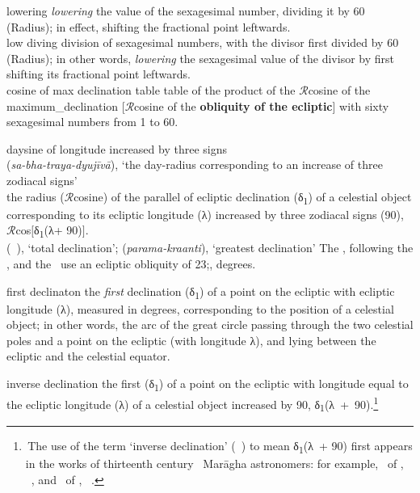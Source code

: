 lowering
\textit{lowering} the value of the sexagesimal number, \ie dividing it by 60 (Radius); in effect, shifting the fractional point leftwards.\\[5pt]

low diving
division of sexagesimal numbers, with the divisor first divided by 60 (Radius); in other words, \textit{lowering} the sexagesimal value of the divisor by first shifting its fractional point leftwards.\\[5pt]


cosine of max declination table
 table of the product of the $\mathcal{R}$\thinspace cosine of the \protect\gls{maximum_declination} [\ie $\mathcal{R}$\thinspace cosine of the \textbf{obliquity of the ecliptic}] with sixty sexagesimal numbers from 1 to 60.

daysine of longitude increased by three signs \\
 (\textit{sa-bha-traya-dyujīvā}), \lit `the day-radius corresponding to an increase of three zodiacal signs'\\
the radius ($\mathcal{R}$\thinspace cosine) of the parallel of ecliptic declination (δ\textsubscript{1}) of a celestial object corresponding to its ecliptic longitude (λ\degree) increased by three zodiacal signs (90\degree), \ie $\mathcal{R}$\thinspace cos$\Big[$δ\textsubscript{1}(λ\degree + 90\degree)$\Big]$.\\[5pt]
        
 (\mayl\idafaconsonant\ \kulli), \lit `total declination';  (\textit{parama-kraanti}), \lit `greatest declination'        
The \ZijiShahJahani, following the \ZijUlughBeg, and the \Siddhantasindhu\ use an ecliptic obliquity of 23;, degrees.

first declinaton
the \textit{first} declination (δ\textsubscript{1}) of a point on the ecliptic with ecliptic longitude (λ\degree), measured in degrees, corresponding to the position of a celestial object; in other words, the arc of the great circle passing through the two celestial poles and a point on the ecliptic (with longitude λ\degree), and lying between the ecliptic and the celestial equator.
        
inverse declination\label{inverse_declination_discussion}
the first \protect{} (δ\textsubscript{1}) of a point on the ecliptic with longitude equal to the ecliptic longitude (λ\degree) of a celestial object increased by 90\degree, \ie δ\textsubscript{1}(λ\degree~+~90\degree).\footnote{\,The use of the term `inverse declination' (\almayl\ \almakus) to mean δ\textsubscript{1}(λ\degree\ + 90\degree) first appears in the works of thirteenth century \ce\ Mar\={a}gha astronomers: for example, \ZijIlkhani\ of \alTusi, \vid\ \textcite[188]{HamadanialTusi}, and \Tajalazyaj\ of \alMaghribi, \vid\ \textcite[196]{Dorce}.}

